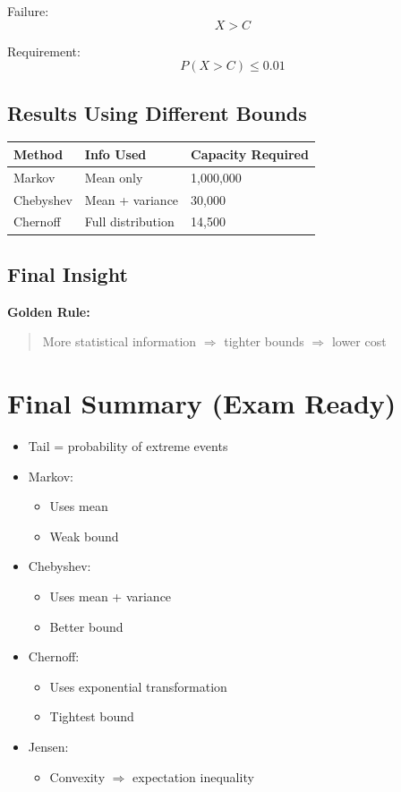 \documentclass[11pt]{article}
\begin{document}
Failure:
\[
X > C
\]

Requirement:
\[
P(X > C) \le 0.01
\]

\subsection*{Results Using Different Bounds}

\begin{center}
\begin{tabular}{lll}
\toprule
Method & Info Used & Capacity Required \\
\midrule
Markov & Mean only & 1,000,000 \\
Chebyshev & Mean + variance & 30,000 \\
Chernoff & Full distribution & 14,500 \\
\bottomrule
\end{tabular}
\end{center}

\subsection*{Final Insight}

\textbf{Golden Rule:}

\begin{quote}
More statistical information $\Rightarrow$ tighter bounds $\Rightarrow$ lower cost
\end{quote}

\section*{Final Summary (Exam Ready)}

\begin{itemize}
\item Tail = probability of extreme events
\item Markov:
\begin{itemize}
\item Uses mean
\item Weak bound
\end{itemize}
\item Chebyshev:
\begin{itemize}
\item Uses mean + variance
\item Better bound
\end{itemize}
\item Chernoff:
\begin{itemize}
\item Uses exponential transformation
\item Tightest bound
\end{itemize}
\item Jensen:
\begin{itemize}
\item Convexity $\Rightarrow$ expectation inequality
\end{itemize}
\end{itemize}
\end{document}
